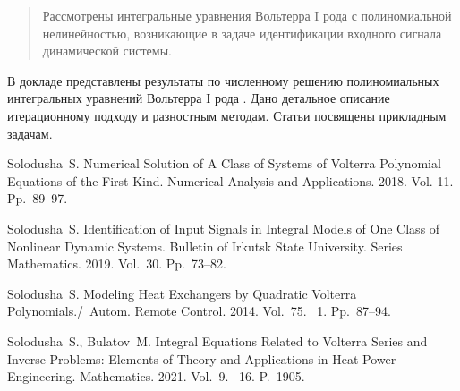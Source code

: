 \maketitle

\begin{abstract}
Рассмотрены интегральные уравнения Вольтерра I рода с полиномиальной нелинейностью, возникающие в задаче идентификации входного сигнала динамической системы.

\end{abstract}


В докладе представлены результаты по численному решению полиномиальных интегральных уравнений Вольтерра I рода \cite{solodusha1,solodusha2}. Дано детальное описание итерационному подходу и разностным методам. Статьи \cite{solodusha3,solodusha4}  посвящены прикладным задачам.




%

\begin{thebibliography}{9} %
  Solodusha~S. Numerical Solution of A Class of Systems of Volterra Polynomial Equations of the First Kind. Numerical Analysis and Applications. 2018. Vol. 11. Pp.~89--97. 

  Solodusha~S. Identification of Input Signals in Integral Models of One Class of Nonlinear  Dynamic Systems. Bulletin of Irkutsk State University. Series Mathematics. 2019. Vol.~30. Pp.~73--82.

 Solodusha~S. Modeling Heat Exchangers by Quadratic Volterra Polynomials./~Autom. Remote Control. 2014. Vol.~75.  \textnumero~1. Pp.~87--94.  

 Solodusha~S., Bulatov~M. Integral Equations Related to Volterra Series and Inverse Problems:
Elements of Theory and Applications in Heat Power Engineering. Mathematics. 2021. Vol.~9.  \textnumero~16. P.~1905. 

\end{thebibliography}





%
